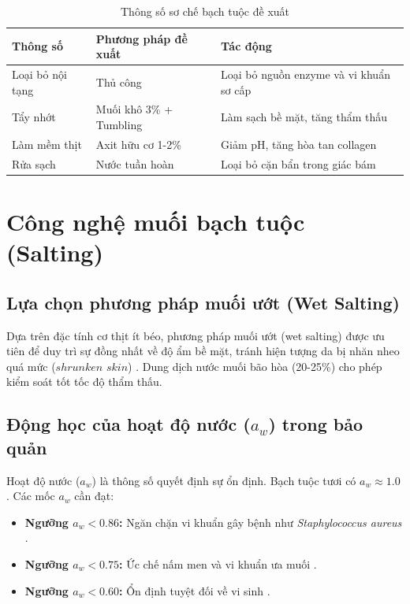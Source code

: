\documentclass[12pt,a4paper]{report}
\begin{document}
\begin{table}[H]
\centering
\caption{Thông số sơ chế bạch tuộc đề xuất}
\begin{tabular}{lp{5cm}p{6cm}}
\toprule
\textbf{Thông số} & \textbf{Phương pháp đề xuất} & \textbf{Tác động} \\
\midrule
Loại bỏ nội tạng & Thủ công & Loại bỏ nguồn enzyme và vi khuẩn sơ cấp \cite{octopus_methods} \\
Tẩy nhớt & Muối khô 3\% + Tumbling & Làm sạch bề mặt, tăng thẩm thấu \cite{octopus_patent} \\
Làm mềm thịt & Axit hữu cơ 1-2\% & Giảm pH, tăng hòa tan collagen \cite{octopus_texture} \\
Rửa sạch & Nước tuần hoàn & Loại bỏ cặn bẩn trong giác bám \cite{octopus_patent} \\
\bottomrule
\end{tabular}
\end{table}

\section{Công nghệ muối bạch tuộc (Salting)}

\subsection{Lựa chọn phương pháp muối ướt (Wet Salting)}

Dựa trên đặc tính cơ thịt ít béo, phương pháp muối ướt (wet salting) được ưu tiên để duy trì sự đồng nhất về độ ẩm bề mặt, tránh hiện tượng da bị nhăn nheo quá mức ($shrunken$ $skin$) \cite{wet_salting}. Dung dịch nước muối bão hòa (20-25\%) cho phép kiểm soát tốt tốc độ thẩm thấu.

\subsection{Động học của hoạt độ nước ($a_w$) trong bảo quản}

Hoạt độ nước ($a_w$) là thông số quyết định sự ổn định. Bạch tuộc tươi có $a_w \approx 1.0$ \cite{aw_test}. Các mốc $a_w$ cần đạt:
\begin{itemize}
    \item \textbf{Ngưỡng $a_w < 0.86$:} Ngăn chặn vi khuẩn gây bệnh như \textit{Staphylococcus aureus} \cite{aw_test}.
    \item \textbf{Ngưỡng $a_w < 0.75$:} Ức chế nấm men và vi khuẩn ưa muối \cite{aw_test}.
    \item \textbf{Ngưỡng $a_w < 0.60$:} Ổn định tuyệt đối về vi sinh \cite{aw_test}.
\end{itemize}
\end{document}
